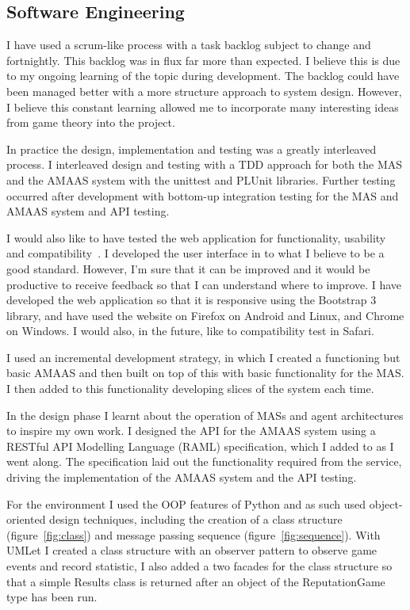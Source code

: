 \documentclass[]{final_report}
\begin{document}
\subsection{Software Engineering}
I have used a scrum-like process with a task backlog subject to change and fortnightly. This backlog was in flux far more than expected. I believe this is due to my ongoing learning of the topic during development. The backlog could have been managed better with a more structure approach to system design. However, I believe this constant learning allowed me to incorporate many interesting ideas from game theory into the project.\par 
In practice the design, implementation and testing was a greatly interleaved process. I interleaved design and testing with a TDD approach for both the MAS and the AMAAS system with the unittest and PLUnit libraries. Further testing occurred after development with bottom-up integration testing for the MAS and AMAAS system and API testing.\par 
I would also like to have tested the web application for functionality, usability and compatibility~\cite{guru99_testing, software_testing_help}. I developed the user interface in to what I believe to be a good standard. However, I'm sure that it can be improved and it would be productive to receive feedback so that I can understand where to improve. I have developed the web application so that it is responsive using the Bootstrap 3 library, and have used the website on Firefox on Android and Linux, and Chrome on Windows. I would also, in the future, like to compatibility test in Safari.\par 
I used an incremental development strategy, in which I created a functioning but basic AMAAS and then built on top of this with basic functionality for the MAS. I then added to this functionality developing slices of the system each time.\par 
In the design phase I learnt about the operation of MASs and agent architectures to inspire my own work. I designed the API for the AMAAS system using a RESTful API Modelling Language (RAML) specification, which I added to as I went along. The specification laid out the functionality required from the service, driving the implementation of the AMAAS system and the API testing.\par 
For the environment I used the OOP features of Python and as such used object-oriented design techniques, including the creation of a class structure (figure~\ref{fig:class}) and message passing sequence (figure~\ref{fig:sequence}). With UMLet I created a class structure with an observer pattern to observe game events and record statistic, I also added a two facades for the class structure so that a simple Results class is returned after an object of the ReputationGame type has been run.\par 
\end{document}
